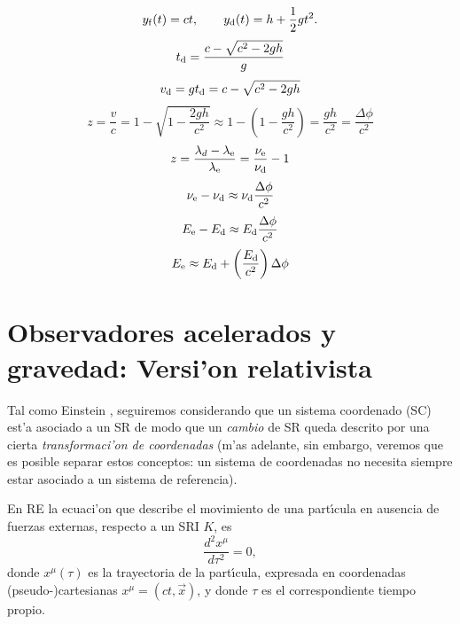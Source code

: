  \begin{equation}
 y_{\rm f}(t) = ct, \qquad y_{\rm d}(t)=h+\frac{1}{2}gt^2.
 \end{equation}
 \begin{equation}
t_{\rm d} = \frac{c-\sqrt{c^2-2gh}}{g}
 \end{equation}
 \begin{equation}
 v_{\rm d}=gt_{\rm d} = c-\sqrt{c^2-2gh}
 \end{equation}
 \begin{equation}
 z=\frac{v}{c}=1-\sqrt{1-\frac{2gh}{c^2}} \approx 1-\left(1-\frac{gh}{c^2}\right) = \frac{gh}{c^2} = \frac{\Delta\phi}{c^2}
 \end{equation}
 \begin{equation}
z = \frac{\lambda_{d}-\lambda_{\rm e}}{\lambda_{\rm e}} = \frac{\nu_{\rm e}}{\nu_{\rm d}}-1
 \end{equation}
 \begin{equation}
 \nu_{\rm e}-\nu_{\rm d} \approx \nu_{\rm d}\frac{\Delta\phi}{c^2}
 \end{equation}
  \begin{equation}
 E_{\rm e}-E_{\rm d} \approx E_{\rm d}\frac{\Delta\phi}{c^2}
 \end{equation}
   \begin{equation}
 E_{\rm e} \approx E_{\rm d} + \left(\frac{E_{\rm d}}{c^2}\right)\Delta\phi
 \end{equation}
\section{Observadores acelerados y gravedad: Versi'on  relativista}

Tal como Einstein \cite{Einstein56}, seguiremos considerando que un sistema coordenado (SC) est'a asociado a un SR de modo que un \textit{cambio} de SR queda descrito por una cierta \textit{transformaci'on de  coordenadas} (m'as adelante, sin embargo, veremos que es posible separar estos conceptos: un sistema de coordenadas no necesita siempre estar asociado a un sistema de referencia).

En RE la ecuaci'on que describe el movimiento de una part{\'\i}cula
en ausencia de fuerzas externas, respecto a un SRI $K$, es
\begin{equation}
\frac{d^2x^\mu}{d\tau ^2}=0, \label{tsri}
\end{equation}
donde $x^\mu(\tau )$ es la trayectoria de la part{\'\i}cula,
expresada en coordenadas (pseudo-)cartesianas $x^\mu=(ct,\vec{x})$, y donde $\tau $ es el correspondiente tiempo propio.

